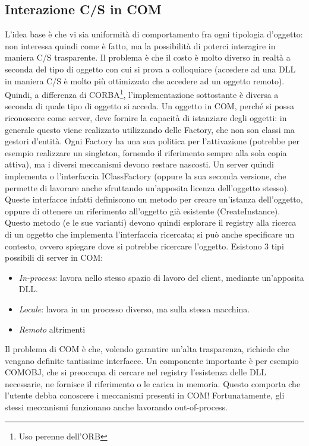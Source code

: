 \subsection{Interazione C/S in COM}
L'idea base è che vi sia uniformità di comportamento fra ogni tipologia d'oggetto: non interessa quindi come è fatto, ma
la possibilità di poterci interagire in maniera C/S trasparente. Il problema è che il costo è molto diverso in realtà a
seconda del tipo di oggetto con cui si prova a colloquiare (accedere ad una DLL in maniera C/S è molto più ottimizzato
che accedere ad un oggetto remoto).
Quindi, a differenza di CORBA\footnote{Uso perenne dell'ORB}, l'implementazione sottostante è diversa a seconda di quale
tipo di oggetto si acceda. Un oggetto in COM, perché si possa riconoscere come server, deve fornire la capacità di
istanziare degli oggetti: in generale questo viene realizzato utilizzando delle Factory, che non son classi ma gestori
d'entità. Ogni Factory ha una sua politica per l'attivazione (potrebbe per esempio realizzare un singleton, fornendo il
riferimento sempre alla sola copia attiva), ma i diversi meccanismi devono restare nascosti.
Un server quindi implementa o l'interfaccia IClassFactory (oppure la sua seconda versione, che permette di lavorare
anche sfruttando un'apposita licenza dell'oggetto stesso). Queste interfacce infatti definiscono un metodo per creare
un'istanza dell'oggetto, oppure di ottenere un riferimento all'oggetto già esistente (CreateInstance). Questo metodo (e
le sue varianti) devono quindi esplorare il registry alla ricerca di un oggetto che implementa l'interfaccia ricercata;
si può anche specificare un contesto, ovvero spiegare dove si potrebbe ricercare l'oggetto.
Esistono 3 tipi possibili di server in COM:
\begin{itemize}
 \item \textit{In-process}: lavora nello stesso spazio di lavoro del client, mediante un'apposita DLL.
 \item \textit{Locale}: lavora in un processo diverso, ma sulla stessa macchina.
 \item \textit{Remoto} altrimenti
\end{itemize}
Il problema di COM è che, volendo garantire un'alta trasparenza, richiede che vengano definite tantissime interfacce.
Un componente importante è per esempio COMOBJ, che si preoccupa di cercare nel registry l'esistenza delle DLL necessarie,
ne fornisce il riferimento o le carica in memoria. Questo comporta che l'utente debba conoscere i meccanismi presenti
in COM! Fortunatamente, gli stessi meccanismi funzionano anche lavorando out-of-process.
